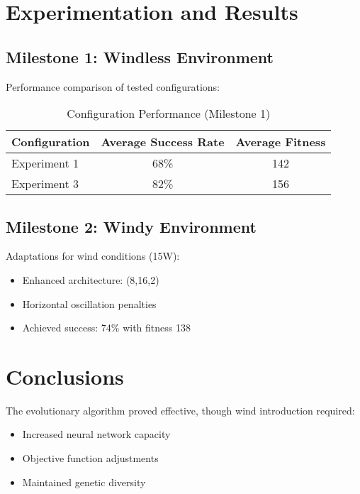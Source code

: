\documentclass{article}
\begin{document}
\section{Experimentation and Results}
\subsection{Milestone 1: Windless Environment}
Performance comparison of tested configurations:

\begin{table}[h]
\centering
\caption{Configuration Performance (Milestone 1)}
\begin{tabular}{@{}lcc@{}}
\toprule
Configuration & Average Success Rate & Average Fitness \\ 
\midrule
Experiment 1 & 68\% & 142 \\
Experiment 3 & 82\% & 156 \\
\bottomrule
\end{tabular}
\end{table}

\subsection{Milestone 2: Windy Environment}
Adaptations for wind conditions (15W):
\begin{itemize}
    \item Enhanced architecture: (8,16,2)
    \item Horizontal oscillation penalties
    \item Achieved success: 74\% with fitness 138
\end{itemize}

\section{Conclusions}
The evolutionary algorithm proved effective, though wind introduction required:
\begin{itemize}
    \item Increased neural network capacity
    \item Objective function adjustments
    \item Maintained genetic diversity
\end{itemize}
\end{document}
